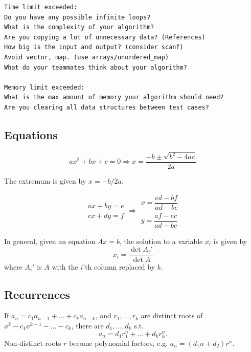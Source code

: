 \begin{multicols}{\Columns}
\begin{lstlisting}[language=raw]
Time limit exceeded:
Do you have any possible infinite loops?
What is the complexity of your algorithm?
Are you copying a lot of unnecessary data? (References)
How big is the input and output? (consider scanf)
Avoid vector, map. (use arrays/unordered_map)
What do your teammates think about your algorithm?

Memory limit exceeded:
What is the max amount of memory your algorithm should need?
Are you clearing all data structures between test cases?
\end{lstlisting}





\subsection{Equations}
\[ax^2+bx+c=0 \Rightarrow x = \frac{-b\pm\sqrt{b^2-4ac}}{2a}\]

The extremum is given by $x = -b/2a$.

\[\begin{aligned}ax+by=e\\cx+dy=f\end{aligned}
\Rightarrow
\begin{aligned}x=\dfrac{ed-bf}{ad-bc}\\y=\dfrac{af-ec}{ad-bc}\end{aligned}\]

In general, given an equation $Ax = b$, the solution to a variable $x_i$ is given by
\[x_i = \frac{\det A_i'}{\det A} \]
where $A_i'$ is $A$ with the $i$'th column replaced by $b$.

\subsection{Recurrences}
If $a_n = c_1 a_{n-1} + \dots + c_k a_{n-k}$, and $r_1, \dots, r_k$ are distinct roots of $x^k - c_1 x^{k-1} - \dots - c_k$, there are $d_1, \dots, d_k$ s.t.
\[a_n = d_1r_1^n + \dots + d_kr_k^n. \]
Non-distinct roots $r$ become polynomial factors, e.g. $a_n = (d_1n + d_2)r^n$.


\end{multicols}
